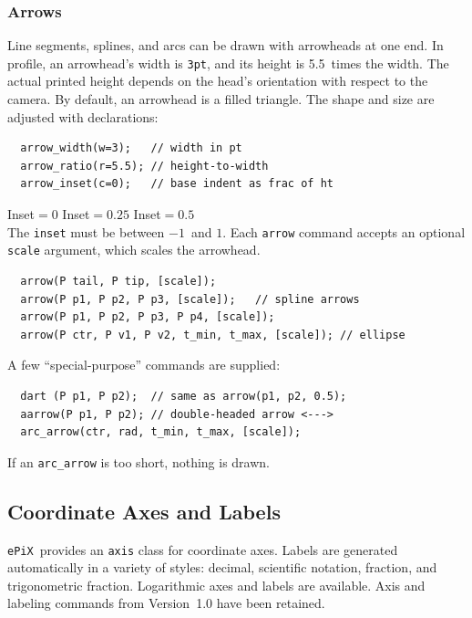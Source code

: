 \documentclass[12pt,letterpaper]{book}
\newcommand{\code}[1]{\texttt{#1}}
\newcommand{\ePiX}{\code{ePiX}}
\newcommand{\teximath}[1]{$#1$}
\newcommand{\findex}[1]{\ignorespaces}
\begin{document}
\subsubsection*{Arrows}

Line segments, splines, and arcs can be drawn with arrowheads at one
end.  In profile, an arrowhead's width is \code{3pt}, and its height
is 5.5~times the width.  The actual printed height depends on the
head's orientation with respect to the camera.  By default, an
arrowhead is a filled triangle. The shape and size are adjusted with
declarations:
\findex{arrow\_width}
\findex{arrow\_ratio}
\findex{arrow\_inset}
\begin{verbatim}
  arrow_width(w=3);   // width in pt
  arrow_ratio(r=5.5); // height-to-width
  arrow_inset(c=0);   // base indent as frac of ht
\end{verbatim}
 Inset\teximath{=0}\qquad
 Inset\teximath{=0.25}\qquad
 Inset\teximath{=0.5} \\
The \code{inset} must be between \teximath{-1}~and \teximath{1}. Each
\code{arrow} command accepts an optional \code{scale} argument, which
scales the arrowhead.
\findex{arrow}
\begin{verbatim}
  arrow(P tail, P tip, [scale]);
  arrow(P p1, P p2, P p3, [scale]);   // spline arrows
  arrow(P p1, P p2, P p3, P p4, [scale]);
  arrow(P ctr, P v1, P v2, t_min, t_max, [scale]); // ellipse
\end{verbatim}
A few ``special-purpose'' commands are supplied:
\findex{dart}
\findex{aarrow}
\findex{arc\_arrow}
\begin{verbatim}
  dart (P p1, P p2);  // same as arrow(p1, p2, 0.5);
  aarrow(P p1, P p2); // double-headed arrow <--->
  arc_arrow(ctr, rad, t_min, t_max, [scale]);
\end{verbatim}
If an \code{arc\_arrow} is too short, nothing is drawn.


\subsection{Coordinate Axes and Labels} 

\ePiX\ provides an \code{axis} class for coordinate axes. Labels are
generated automatically in a variety of styles: decimal, scientific
notation, fraction, and trigonometric fraction. Logarithmic axes and
labels are available. Axis and labeling commands from Version~1.0 have
been retained.
\end{document}
